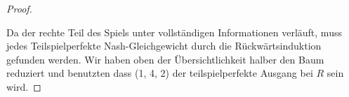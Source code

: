 \documentclass[12pt]{article}
\begin{document}
\begin{enumerate}[label=\alph*\upshape)]
\begin{proof}
\begin{figure}[htbp]
\end{figure}

		Da der rechte Teil des Spiels unter vollständigen Informationen verläuft, muss jedes Teilspielperfekte Nash-Gleichgewicht durch die Rückwärtsinduktion gefunden werden. Wir haben oben der Übersichtlichkeit halber den Baum reduziert und benutzten dass (1, 4, 2) der teilspielperfekte Ausgang bei $R$ sein wird.
		

\end{proof}
\end{enumerate}
\end{document}
